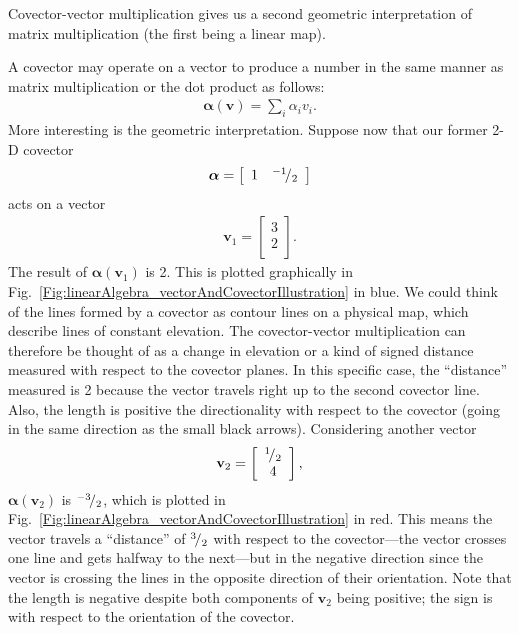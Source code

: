 Covector-vector multiplication gives us a second geometric interpretation of matrix multiplication (the first being a linear map).

A covector may operate on a vector to produce a number in the same manner as matrix multiplication or the dot product as follows:
\begin{align}
  \boldsymbol{\alpha}(\mathbf{v}) = \sum_i \alpha_i v_i.
\end{align}
More interesting is the geometric interpretation. Suppose now that our former 2-D covector
\begin{align}
  \boldsymbol\alpha = \left[ \begin{array}{c c} 1 & {}^{-1}\!/_{2} \\ \end{array} \right]  \nonumber
\end{align}
acts on a vector
\begin{align}
  \mathbf{v}_1 = \left[ \begin{array}{c} 3 \\ 2 \\ \end{array} \right] . \nonumber
\end{align}
The result of $\boldsymbol\alpha(\mathbf{v}_1)$ is 2. This is plotted graphically in Fig.~\ref{Fig:linearAlgebra_vectorAndCovectorIllustration} in blue. We could think of the lines formed by a covector as contour lines on a physical map, which describe lines of constant elevation. The covector-vector multiplication can therefore be thought of as a change in elevation or a kind of signed distance measured with respect to the covector planes. In this specific case, the ``distance'' measured is 2 because the vector travels right up to the second covector line. Also, the length is positive the directionality with respect to the covector (going in the same direction as the small black arrows). Considering another vector
\begin{align}
  \mathbf{v}_2 = \left[ \begin{array}{c} {}^{1}\!/_{2} \\ 4 \\ \end{array} \right] , \nonumber
\end{align}
$\boldsymbol\alpha(\mathbf{v}_2)$ is ${}^{-3}\!/_{2}$, which is plotted in Fig.~\ref{Fig:linearAlgebra_vectorAndCovectorIllustration} in red. This means the vector travels a ``distance'' of ${}^{3}\!/_{2}$ with respect to the covector---the vector crosses one line and gets halfway to the next---but in the negative direction since the vector is crossing the lines in the opposite direction of their orientation. Note that the length is negative despite both components of $\mathbf{v}_2$ being positive; the sign is with respect to the orientation of the covector.

